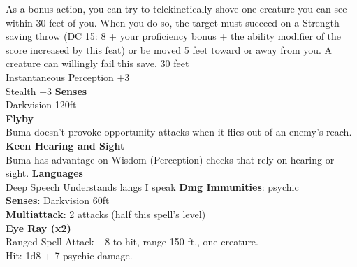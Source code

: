 \documentclass{article}
\begin{document}
    {As a bonus action, you can try to telekinetically shove one creature you can see within 30 feet of you. When you do so, the target must succeed on a Strength saving throw (DC 15: 8 + your proficiency bonus + the ability modifier of the score increased by this feat) or be moved 5 feet toward or away from you. A creature can willingly fail this save.}
    {30 feet\\Instantaneous}%
    {Perception +3\\Stealth +3}
    {%
    \textbf{Senses}\\
    Darkvision 120ft
    \\[1mm]
    \textbf{Flyby}\\
    Buma doesn't provoke opportunity attacks when it flies out of an enemy's reach.
    \\[1mm]
    \textbf{Keen Hearing and Sight}\\
    Buma has advantage on Wisdom (Perception) checks that rely on hearing or sight.
    }%
    {\textbf{Languages}\\
    Deep Speech
    Understands langs I speak}
    {\textbf{Dmg Immunities}: psychic
    \\[1mm]
    \textbf{Senses}: Darkvision 60ft
    \\[1mm]
    \textbf{Multiattack}: 2 attacks (half this spell’s level)
    \\[1mm]
    \textbf{Eye Ray (x2)}\\
    Ranged Spell Attack +8 to hit, range 150 ft., one creature.\\
    Hit: 1d8 + 7 psychic damage.
    }%
\end{document}
